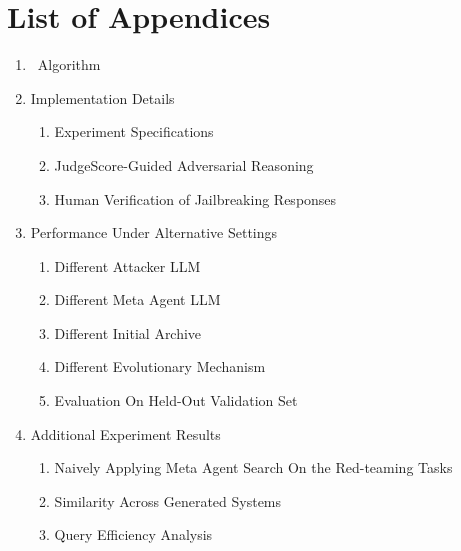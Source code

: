 \section*{\LARGE List of Appendices}

\vspace*{20pt}
\vspace*{-5pt}
{\large
\begin{enumerate}
  \item [\ref{appx: agenticred algorithm}] \method~Algorithm
  \item [\ref{appx: implementation details}] Implementation Details
  \begin{enumerate}
      \item[\ref{appx: experiment specifications}] Experiment Specifications
      \item[\ref{appx: JudgeScore-Guided Adversarial Reasoning}] JudgeScore-Guided Adversarial Reasoning
      \item[\ref{appx: human study}] Human Verification of Jailbreaking Responses
  \end{enumerate}
  \item[\ref{appx: performance under alternative settings}] Performance Under Alternative Settings
  \begin{enumerate}
      \item[\ref{appx: vicuna attacker}.1] Different Attacker LLM
      \item[\ref{appx: deepseek meta agent}.2] Different Meta Agent LLM
      \item[\ref{appx: degraded archive}.3] Different Initial Archive
      \item[\ref{appx: evolutionary selection}.4] Different Evolutionary Mechanism
      \item[\ref{appx: held-out test}.5] Evaluation On Held-Out Validation Set
  \end{enumerate}
  \item[\ref{appx: additional results}] Additional Experiment Results
  \begin{enumerate}
      \item[\ref{appx: naive meta agent search}] Naively Applying Meta Agent Search On the Red-teaming Tasks
      \item[\ref{appx: similarity across generated systems}] Similarity Across Generated Systems
      \item[\ref{appx: query efficiency analysis}] Query Efficiency Analysis

\end{enumerate}
\end{enumerate}}
